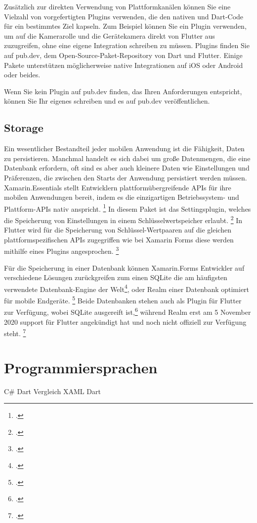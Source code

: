 Zusätzlich zur direkten Verwendung von Plattformkanälen können Sie eine Vielzahl von vorgefertigten Plugins verwenden, die den nativen und Dart-Code für ein bestimmtes Ziel kapseln. Zum Beispiel können Sie ein Plugin verwenden, um auf die Kamerarolle und die Gerätekamera direkt von Flutter aus zuzugreifen, ohne eine eigene Integration schreiben zu müssen. Plugins finden Sie auf pub.dev, dem Open-Source-Paket-Repository von Dart und Flutter. Einige Pakete unterstützen möglicherweise native Integrationen auf iOS oder Android oder beides.

Wenn Sie kein Plugin auf pub.dev finden, das Ihren Anforderungen entspricht, können Sie Ihr eigenes schreiben und es auf pub.dev veröffentlichen.


\subsection{Storage}
Ein wesentlicher Bestandteil jeder mobilen Anwendung ist die Fähigkeit,  Daten zu persistieren.  Manchmal handelt es sich dabei um große Datenmengen,  die eine Datenbank erfordern,  oft sind es aber auch kleinere Daten wie Einstellungen und Präferenzen, die zwischen den Starts der Anwendung persistiert werden müssen.   
Xamarin.Essentials stellt Entwicklern plattformübergreifende APIs für ihre mobilen Anwendungen bereit,  indem es die einzigartigen Betriebssystem- und Plattform-APIs nativ anspricht. \footcite[Vgl.][Abgerufen am \today]{MicrosoftXamEssentials2020} In diesem Paket ist das Settingsplugin, welches die Speicherung von Einstellungen in einem Schlüsselwertspeicher erlaubt.  \footcite[Vgl.][Abgerufen am \today]{MicrosoftXamSettings2019} In Flutter wird für die Speicherung von Schlüssel-Wertpaaren auf die gleichen plattformspezifischen APIs zugegriffen wie bei Xamarin Forms diese werden mithilfe eines Plugins angesprochen.  \footcite[Vgl.][Abgerufen am \today]{GoogleFlutterSharedPreferences2020} 

Für die Speicherung in einer Datenbank können Xamarin.Forms Entwickler auf verschiedene Lösungen zurückgreifen zum einen SQLite  die am häufigsten verwendete Datenbank-Engine der Welt\footcite[Vgl.][Abgerufen am \today]{SQLiteConsortium2020},  oder Realm einer Datenbank optimiert für mobile Endgeräte. \footcite[Vgl.][Abgerufen am \today]{MongoDBRealm2020} Beide Datenbanken stehen auch als Plugin für Flutter zur Verfügung, wobei SQLite ausgereift ist,\footcite[Vgl.][Abgerufen am \today]{Tekartik2020} während Realm erst am 5 November 2020 support für Flutter angekündigt hat und noch nicht offiziell zur Verfügung steht. \footcite[Vgl.][Abgerufen am \today]{MongoDBFlutterSupport2020}


\section{Programmiersprachen}
C\# Dart Vergleich
XAML Dart


